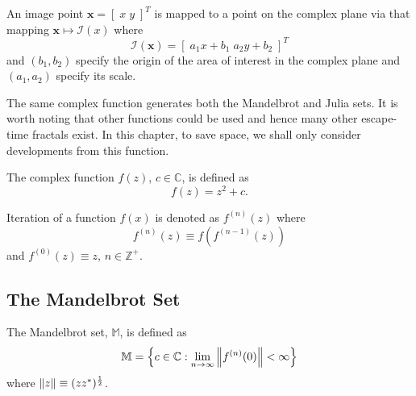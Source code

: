 \begin{definition}
An image point $\mathbf{x} = [\; x\;y \;]^T$ is mapped to a point on the 
complex plane via that mapping $\mathbf{x} \mapsto {\mathcal I}(x)$ where
\[
{\mathcal I}({\mathbf x}) = [\; a_1 x + b_1 \; a_2 y + b_2 \;]^T
\]
and $(b_1,b_2)$ specify the origin of the area of interest in the complex
plane and $(a_1,a_2)$ specify its scale.
\end{definition}

The same complex function generates both the Mandelbrot and
Julia sets\cite{FRAC:Mandelbrot, FRAC:JuliaMandelBook}. It is worth noting
that other functions could be used and hence many other escape-time fractals
exist. In this chapter, to save space, we shall only consider developments from this function.

\begin{definition}
The complex function $f(z)$, $c \in {\mathbb C}$,
    is defined as
\[
f(z) = z^2 + c.
\]
\end{definition}

\begin{definition}[Iteration]
Iteration of a function $f(x)$ is denoted as $f^{(n)}(z)$ where
\[
f^{(n)}(z) \equiv f(f^{(n-1)}(z))
\]
and $f^{(0)}(z) \equiv z$, $n \in {\mathbb Z}^+$.
\end{definition}

\subsection{The Mandelbrot Set}

\begin{definition}
The Mandelbrot set, $\mathbb{M}$, is defined as
\[
\mathbb{M} = 
\left\{c \in \mathbb{C} 
: \lim_{n \rightarrow \infty} \left\Vert f^{(n)}(0) \right\Vert < \infty \right\} 
\]
where $\left\Vert z \right\Vert \equiv (zz^*)^\frac{1}{2}$.
\end{definition}

